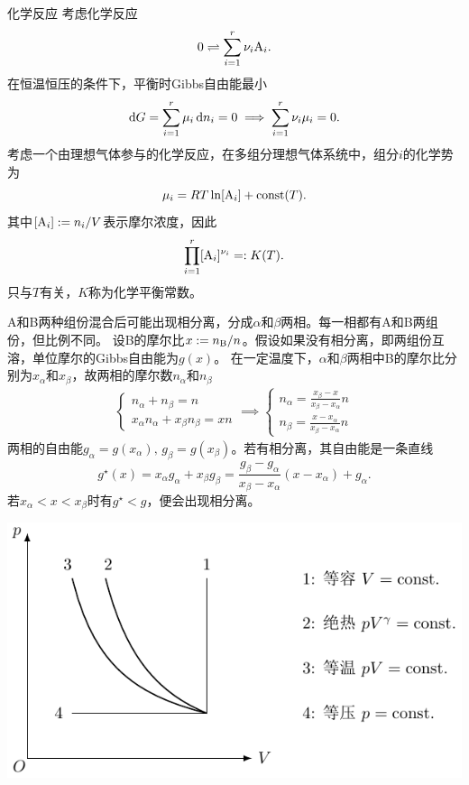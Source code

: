 \begin{example}
	{化学反应}{}
	考虑化学反应
	\[
		0\rightleftharpoons\sum_{i=1}^r\nu_i\mathrm{A}_i.
	\]
	在恒温恒压的条件下，平衡时Gibbs自由能最小
	\[
		\mathop{}\!\mathrm{d} G=\sum_{i=1}^r\mu_i\mathop{}\!\mathrm{d} n_i=0\implies\sum_{i=1}^r\nu_i\mu_i=0.
	\]
	考虑一个由理想气体参与的化学反应，在多组分理想气体系统中，组分$i$的化学势为
	\[
		\mu_i=RT\ln[\mathrm{A}_i]+\text{const}(T).
	\]
	其中$[\mathrm{A}_i]:=n_i/V$表示摩尔浓度，因此
	\begin{equation}
		\prod_{i=1}^r[\mathrm{A}_i]^{\nu_i}=:K(T).
	\end{equation}
	只与$T$有关，$K$称为化学平衡常数。
\end{example}


A和B两种组份混合后可能出现相分离，分成$\alpha$和$\beta$两相。每一相都有A和B两组份，但比例不同。%
设B的摩尔比$x:=n_{\mathrm{B}}/n$。假设如果没有相分离，即两组份互溶，单位摩尔的Gibbs自由能为$g(x)$。
在一定温度下，$\alpha$和$\beta$两相中B的摩尔比分别为$x_\alpha$和$x_\beta$，故两相的摩尔数$n_\alpha$和$n_\beta$%
\begin{align*}
	\begin{cases}
		n_\alpha+n_\beta=n  \\
		x_\alpha n_\alpha+x_\beta n_\beta=xn
	\end{cases}
	\implies
	\begin{cases}
		n_\alpha=\frac{x_\beta-x}{x_\beta-x_\alpha}n  \\
		n_\beta =\frac{x-x_\alpha}{x_\beta-x_\alpha}n
	\end{cases}
\end{align*}
两相的自由能$g_\alpha=g(x_\alpha),\,g_\beta=g(x_\beta)$。若有相分离，其自由能是一条直线
\[
	g^\star(x)=x_\alpha g_\alpha+x_\beta g_\beta
	=\frac{g_\beta-g_\alpha}{x_\beta-x_\alpha}(x-x_\alpha)+g_\alpha.
\]
若$x_\alpha<x<x_\beta$时有$g^\star<g$，便会出现相分离。

\begin{center}
	\includegraphics[page=18]{figures/tikz/coordinates.pdf}
	\label{fig:phase separation}
\end{center}

